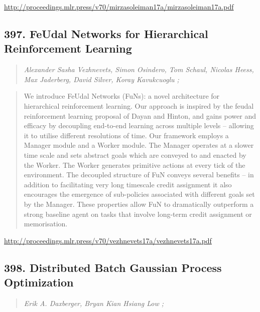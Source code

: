 \documentclass{article}
\begin{document}
\href{http://proceedings.mlr.press/v70/mirzasoleiman17a/mirzasoleiman17a.pdf}{http://proceedings.mlr.press/v70/mirzasoleiman17a/mirzasoleiman17a.pdf}

\subsection{397. FeUdal Networks for Hierarchical Reinforcement Learning}

\begin{quote}
\footnotesize{\textit{Alexander Sasha Vezhnevets, Simon Osindero, Tom Schaul, Nicolas Heess, Max Jaderberg, David Silver, Koray Kavukcuoglu ;}}
\end{quote}

\begin{quote}
    We introduce FeUdal Networks (FuNs): a novel architecture for hierarchical reinforcement learning. Our approach is inspired by the feudal reinforcement learning proposal of Dayan and Hinton, and gains power and efficacy by decoupling end-to-end learning across multiple levels – allowing it to utilise different resolutions of time. Our framework employs a Manager module and a Worker module. The Manager operates at a slower time scale and sets abstract goals which are conveyed to and enacted by the Worker. The Worker generates primitive actions at every tick of the environment. The decoupled structure of FuN conveys several benefits – in addition to facilitating very long timescale credit assignment it also encourages the emergence of sub-policies associated with different goals set by the Manager. These properties allow FuN to dramatically outperform a strong baseline agent on tasks that involve long-term credit assignment or memorisation.  \end{quote}

\href{http://proceedings.mlr.press/v70/vezhnevets17a/vezhnevets17a.pdf}{http://proceedings.mlr.press/v70/vezhnevets17a/vezhnevets17a.pdf}

\subsection{398. Distributed Batch Gaussian Process Optimization}

\begin{quote}
\footnotesize{\textit{Erik A. Daxberger, Bryan Kian Hsiang Low ;}}
\end{quote}
\end{document}
